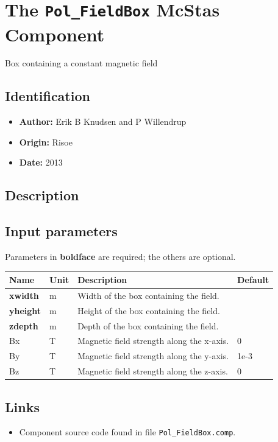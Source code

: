 \section{The \texttt{Pol\_FieldBox} McStas Component}
Box containing a constant magnetic field

\subsection*{Identification}
\begin{itemize}
  \item \textbf{Author:} Erik B Knudsen and P Willendrup
  \item \textbf{Origin:} Risoe
  \item \textbf{Date:} 2013
\end{itemize}

\subsection*{Description}


\subsection*{Input parameters}
Parameters in \textbf{boldface} are required; the others are optional.

\begin{longtable}{p{}p{}p{}p{}}
\toprule
\textbf{Name} & \textbf{Unit} & \textbf{Description} & \textbf{Default} \\
\midrule
\endhead
\textbf{xwidth} & m & Width of the box containing the field. &  \\
\textbf{yheight} & m & Height of the box containing the field. &  \\
\textbf{zdepth} & m & Depth of the box containing the field. &  \\
Bx & T & Magnetic field strength along the x-axis. & 0 \\
By & T & Magnetic field strength along the y-axis. & 1e-3 \\
Bz & T & Magnetic field strength along the z-axis. & 0 \\
\bottomrule
\end{longtable}

\subsection*{Links}
\begin{itemize}
  \item Component source code found in file \texttt{Pol\_FieldBox.comp}.
\end{itemize}
